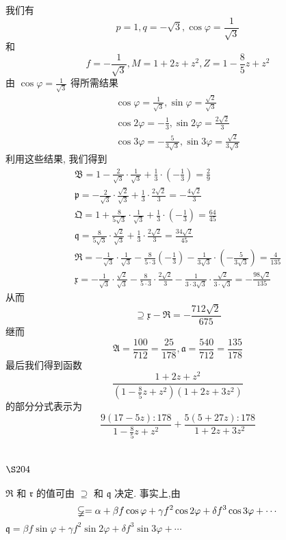 我们有
\[
p=1, q=-\sqrt{3}, \cos \varphi=\frac{1}{\sqrt{3}}
\]
和
\[
f=-\frac{1}{\sqrt{3}}, M=1+2 z+z^{2}, Z=1-\frac{8}{5} z+z^{2}
\]
由 $\cos \varphi=\frac{1}{\sqrt{3}}$ 得所需结果 
\[
\begin{gathered}
\cos \varphi=\frac{1}{\sqrt{3}}, \sin \varphi=\frac{\sqrt{2}}{\sqrt{3}} \\
\cos 2 \varphi=-\frac{1}{3}, \sin 2 \varphi=\frac{2 \sqrt{2}}{3} \\
\cos 3 \varphi=-\frac{5}{3 \sqrt{3}}, \sin 3 \varphi=\frac{\sqrt{2}}{3 \sqrt{3}}
\end{gathered}
\]
利用这些结果, 我们得到
\[
\begin{gathered}
\mathfrak{B}=1-\frac{2}{\sqrt{3}} \cdot \frac{1}{\sqrt{3}}+\frac{1}{3} \cdot\left(-\frac{1}{3}\right)=\frac{2}{9} \\
\mathfrak{p}=-\frac{2}{\sqrt{3}} \cdot \frac{\sqrt{2}}{\sqrt{3}}+\frac{1}{3} \cdot \frac{2 \sqrt{2}}{3}=-\frac{4 \sqrt{2}}{3} \\
\mathfrak{Q}=1+\frac{8}{5 \sqrt{3}} \cdot \frac{1}{\sqrt{3}}+\frac{1}{3} \cdot\left(-\frac{1}{3}\right)=\frac{64}{45} \\
\mathfrak{q}=\frac{8}{5 \sqrt{3}} \cdot \frac{\sqrt{2}}{\sqrt{3}}+\frac{1}{3} \cdot \frac{2 \sqrt{2}}{3}=\frac{34 \sqrt{2}}{45} \\
\mathfrak{R}=-\frac{1}{\sqrt{3}} \cdot \frac{1}{\sqrt{3}}-\frac{8}{5 \cdot 3}\left(-\frac{1}{3}\right)-\frac{1}{3 \sqrt{3}} \cdot\left(-\frac{5}{3 \sqrt{3}}\right)=\frac{4}{135} \\
\mathfrak{x}=-\frac{1}{\sqrt{3}} \cdot \frac{\sqrt{2}}{\sqrt{3}}-\frac{8}{5 \cdot 3} \cdot \frac{2 \sqrt{2}}{3}-\frac{1}{3 \cdot 3 \sqrt{3}} \cdot \frac{\sqrt{2}}{3 \cdot \sqrt{3}}=-\frac{98 \sqrt{2}}{135}
\end{gathered}
\]
从而
\[
\supseteq \mathfrak{x}-\mathfrak{R}=-\frac{712 \sqrt{2}}{675}
\]
继而
\[
\mathfrak{A}=\frac{100}{712}=\frac{25}{178}, \mathfrak{a}=\frac{540}{712}=\frac{135}{178}
\]
最后我们得到函数
\[
\frac{1+2 z+z^{2}}{\left(1-\frac{8}{5} z+z^{2}\right)\left(1+2 z+3 z^{2}\right)}
\]
的部分分式表示为
\[
\frac{9(17-5 z): 178}{1-\frac{8}{5} z+z^{2}}+\frac{5(5+27 z): 178}{1+2 z+3 z^{2}}
\]
\section{$\S 204$}

$\Re$ 和 $\mathfrak{r}$ 的值可由 $\supseteq$ 和 $\mathfrak{q}$ 决定. 事实上,由
\[
\varsubsetneqq=\alpha+\beta f \cos \varphi+\gamma f^{2} \cos 2 \varphi+\delta f^{3} \cos 3 \varphi+\cdots
\]
$\mathfrak{q}=\beta f \sin \varphi+\gamma f^{2} \sin 2 \varphi+\delta f^{3} \sin 3 \varphi+\cdots$


